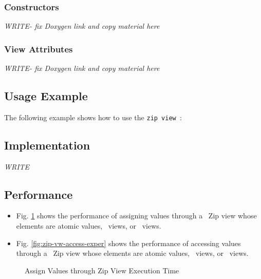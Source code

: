 \subsubsection{Constructors}

\textit{WRITE-  fix Doxygen link and copy material here}

\subsubsection{View Attributes}

\textit{WRITE-  fix Doxygen link and copy material here}

\subsection{Usage Example} \label{sec-zip-vw-use}

The following example shows how to use the \texttt{zip view }:


\subsection{Implementation} \label{sec-zip-vw-impl}

\textit{WRITE}

\subsection{Performance} \label{sec-zip-vw-perf}

\begin{itemize}
\item
Fig. \ref{fig:zip-vw-assign-exper}
shows the performance of assigning values through a \stapl\ Zip view
whose elements are atomic values, \stl\ views, or \stapl\ views.
\item
Fig. \ref{fig:zip-vw-access-exper}
shows the performance of accessing values through a \stapl\ Zip view
whose elements are atomic values, \stl\ views, or \stapl\ views.
\end{itemize}

\begin{figure}[p]
\caption{Assign Values through Zip View Execution Time}
\label{fig:zip-vw-assign-exper}
\end{figure}

